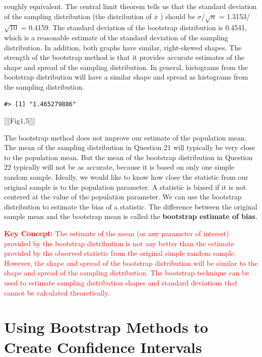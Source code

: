 \documentclass[
]{report}
\begin{document}
roughly equivalent. The central limit theorem tells us that the standard deviation of the sampling distribution (the distribution of \(\bar{x}\) ) should be \(\sigma\)/\(\sqrt{n}\) = 1.3153/\(\sqrt{10}\) = 0.4159. The standard deviation of the bootstrap distribution is 0.4541, which is a reasonable estimate of the standard deviation of the sampling distribution. In addition, both graphs have similar, right-skewed shapes. The strength of the bootstrap method is that it provides accurate estimates of the shape and spread of the sampling distribution. In general, histograms from the bootstrap distribution will have a similar shape and spread as histograms
from the sampling distribution.

\begin{verbatim}
#> [1] "1.465279886"
\end{verbatim}

{[}{[}{[}Fig1,5{]}{]}{]}

The bootstrap method does not improve our estimate of the population mean. The mean of the sampling distribution in Question 21 will typically be very close to the population mean. But the mean of the bootstrap distribution in Question 22 typically will not be as accurate, because it is based on only one simple random sample. Ideally, we would like to know how close the statistic from our original sample is to the population parameter. A statistic is biased if it is not centered at the value of the population parameter. We can use the bootstrap distribution to estimate the bias of a statistic. The difference between the original sample mean and the bootstrap mean is called the \textbf{bootstrap estimate of bias}.

\Large

\textbf{\textcolor{red}{Key Concept:}}
\textcolor{red}{The estimate of the mean (or any parameter of interest) provided by the bootstrap distribution is not any better than the estimate provided by the observed statistic from the original simple random sample. However, the shape and spread of the bootstrap distribution will be similar to the shape and spread of the sampling distribution. The bootstrap technique can be used to estimate sampling distribution shapes and standard deviations that cannot be calculated theoretically.}

\normalsize

\section{\texorpdfstring{\textbf{Using Bootstrap Methods to Create Confidence Intervals}}{Using Bootstrap Methods to Create Confidence Intervals}}\label{using-bootstrap-methods-to-create-confidence-intervals}
\end{document}
